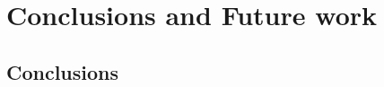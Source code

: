 \documentclass[../report.tex]{subfiles}
\begin{document}
		
\chapter{Conclusions and Future work}

\section{Conclusions}
\end{document}
